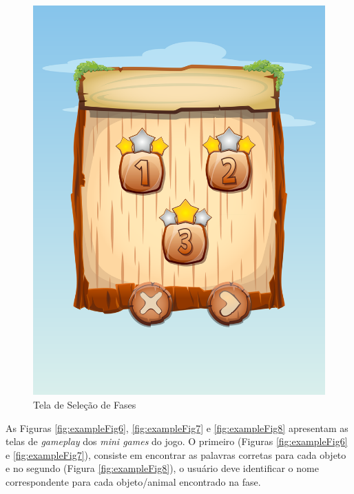 \documentclass[12pt]{article}
\begin{document}
\begin{figure}[!htb]
		\includegraphics[width=\linewidth]{IMG/selectFases.png}
		\caption{Tela de Seleção de Fases}\label{fig:fases}
		\endminipage
	\end{figure}
		
		As Figuras \ref{fig:exampleFig6}, \ref{fig:exampleFig7} e \ref{fig:exampleFig8} apresentam as telas de \textit{gameplay} dos \textit{mini games} do jogo. O primeiro (Figuras \ref{fig:exampleFig6} e \ref{fig:exampleFig7}),  consiste em encontrar as palavras corretas para cada objeto e no segundo (Figura \ref{fig:exampleFig8}), o usuário deve identificar o nome correspondente para cada objeto/animal encontrado na fase.
	
\end{document}
